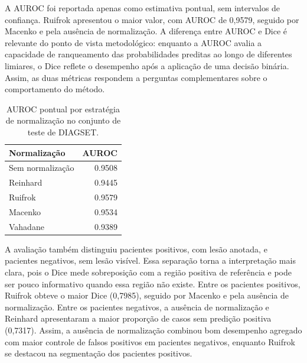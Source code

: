 A AUROC foi reportada apenas como estimativa pontual, sem intervalos de confiança. Ruifrok apresentou o maior valor, com AUROC de 0{,}9579, seguido por Macenko e pela ausência de normalização. A diferença entre AUROC e Dice é relevante do ponto de vista metodológico: enquanto a AUROC avalia a capacidade de ranqueamento das probabilidades preditas ao longo de diferentes limiares, o Dice reflete o desempenho após a aplicação de uma decisão binária. Assim, as duas métricas respondem a perguntas complementares sobre o comportamento do método.

\begin{table}[!htb]
\centering
\caption{AUROC pontual por estratégia de normalização no conjunto de teste de DIAGSET.}
\label{tab:results_diagset-auc}
\small
\begin{tabular}{lr}
\toprule
Normalização & AUROC \\
\midrule
Sem normalização & 0.9508 \\
Reinhard & 0.9445 \\
Ruifrok & 0.9579 \\
Macenko & 0.9534 \\
Vahadane & 0.9389 \\
\bottomrule
\end{tabular}
\end{table}

A avaliação também distinguiu pacientes positivos, com lesão anotada, e pacientes
negativos, sem lesão visível. Essa separação torna a interpretação mais clara,
pois o Dice mede sobreposição com a região positiva de referência e pode ser
pouco informativo quando essa região não existe. Entre os pacientes positivos,
Ruifrok obteve o maior Dice (0{,}7985), seguido por Macenko e pela ausência de
normalização. Entre os pacientes negativos, a ausência de normalização e Reinhard
apresentaram a maior proporção de casos sem predição positiva (0{,}7317). Assim,
a ausência de normalização combinou bom desempenho agregado com maior controle
de falsos positivos em pacientes negativos, enquanto Ruifrok se destacou na
segmentação dos pacientes positivos.

